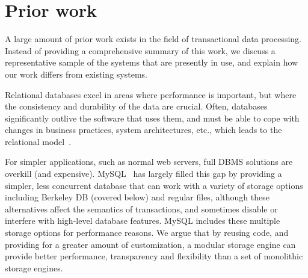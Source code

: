 \documentclass[10pt,letterpaper,twocolumn,english]{article}
\newcommand{\yad}{Lemon\xspace}
\begin{document}
\section{Prior work}

A large amount of prior work exists in the field of transactional data
processing.  Instead of providing a comprehensive summary of this
work, we discuss a representative sample of the systems that are
presently in use, and explain how our work differs from existing
systems.




Relational databases excel in areas
where performance is important, but where the consistency and
durability of the data are crucial.  Often, databases significantly
outlive the software that uses them, and must be able to cope with
changes in business practices, system architectures,
etc., which leads to the relational model~\cite{relational}.

For simpler applications, such as normal web servers, full DBMS
solutions are overkill (and expensive).  MySQL~\cite{mysql} has
largely filled this gap by providing a simpler, less concurrent
database that can work with a variety of storage options including
Berkeley DB (covered below) and regular files, although these
alternatives affect the semantics of transactions, and sometimes 
disable or interfere with high-level database features.  MySQL 
includes these multiple storage options for performance reasons.  
We argue that by reusing code, and providing for a greater amount 
of customization, a modular storage engine can provide better 
performance, transparency and flexibility than a 
set of monolithic storage engines.

\end{document}
